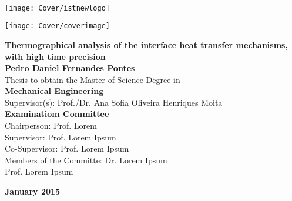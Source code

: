 \setcounter{page}{1} 


\thispagestyle{empty}
\begin{flushleft} ~\\ \vspace{-12mm} \hspace{-12mm}  \texttt{[image: Cover/istnewlogo]} 
\vspace{10mm}
\\ \begin{center} \texttt{[image: Cover/coverimage]}  \end{center} %
 \vspace{5mm}
\centering
\LARGE \textbf{Thermographical analysis of the interface heat transfer mechanisms, with high time precision}
\\ \vspace{15mm}
\Large \textbf{Pedro Daniel Fernandes Pontes} \\
\vspace{12mm}
\large Thesis to obtain the Master of Science Degree in
\\ \vspace{2mm}
\LARGE \textbf{Mechanical Engineering}
\\ \vspace{10mm}
\large Supervisor(s): Prof./Dr. Ana Sofia Oliveira Henriques Moita 
\\ \vspace{15mm}
\Large \textbf{Examinatiom Committee}
\\ \vspace{5mm}
\large Chairperson:	Prof. Lorem \\
\large Supervisor: Prof. Lorem Ipsum\\
\large Co-Supervisor: Prof. Lorem Ipsum \\
\large Members of the Committe: Dr. Lorem Ipsum \\
Prof. Lorem Ipsum
 
\vspace{15mm}

\Large \textbf{January 2015} \\
\let\thepage\relax
\end{flushleft}
\pagebreak


\clearpage

\thispagestyle{empty}
\cleardoublepage

\setcounter{page}{1} 

\baselineskip 18pt %
